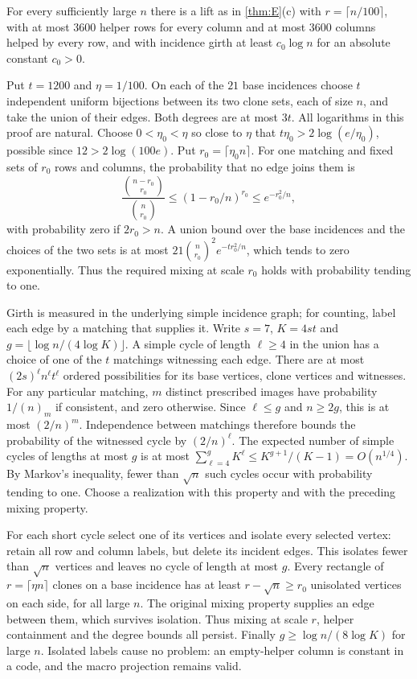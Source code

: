\begin{proposition}\label{prop:lifts}
\notformalized
For every sufficiently large $n$ there is a lift as in \cref{thm:E}(c) with $r=\lceil n/100\rceil$, with at most
$3600$ helper rows for every column and at most $3600$ columns helped by every row, and with incidence girth at least
$c_0\log n$ for an absolute constant $c_0>0$.
\end{proposition}
\begin{informalproof}
Put $t=1200$ and $\eta=1/100$. On each of the $21$ base incidences choose $t$ independent uniform bijections
between its two clone sets, each of size $n$, and take the union of their edges. Both degrees are at most $3t$.
All logarithms in this proof are natural. Choose $0<\eta_0<\eta$ so close to $\eta$ that
$t\eta_0>2\log(e/\eta_0)$, possible since $12>2\log(100e)$. Put $r_0=\lceil\eta_0 n\rceil$.
For one matching and fixed sets of $r_0$ rows and columns, the probability that no edge joins them is
\[
 \frac{\binom{n-r_0}{r_0}}{\binom n{r_0}}
 \le (1-r_0/n)^{r_0}\le e^{-r_0^2/n},
\]
with probability zero if $2r_0>n$. A union bound over the base incidences and the choices of the two sets is at most
$21\binom n{r_0}^{2}e^{-t r_0^2/n}$, which tends to zero exponentially. Thus the required mixing at scale $r_0$
holds with probability tending to one.

Girth is measured in the underlying simple incidence graph; for counting, label each edge by a matching that
supplies it. Write $s=7$, $K=4st$ and
$g=\lfloor\log n/(4\log K)\rfloor$. A simple cycle of length $\ell\ge4$ in the union has a choice of one of the
$t$ matchings witnessing each edge. There are at most $(2s)^\ell n^\ell t^\ell$ ordered possibilities for its
base vertices, clone vertices and witnesses. For any particular matching, $m$ distinct prescribed images have
probability $1/(n)_m$ if consistent, and zero otherwise. Since $\ell\le g$ and $n\ge2g$, this is at most
$(2/n)^m$. Independence between matchings therefore bounds the probability of the witnessed cycle by
$(2/n)^\ell$. The expected number of simple cycles of lengths at most $g$ is at most
$\sum_{\ell=4}^{g}K^\ell\le K^{g+1}/(K-1)=O(n^{1/4})$.
By Markov's inequality, fewer than $\sqrt n$ such cycles occur with probability tending to one. Choose a realization
with this property and with the preceding mixing property.

For each short cycle select one of its vertices and isolate every selected vertex: retain all row and column
labels, but delete its incident edges. This isolates fewer than $\sqrt n$ vertices and leaves no cycle of length
at most $g$. Every rectangle of $r=\lceil\eta n\rceil$ clones on a base incidence has at least $r-\sqrt n\ge r_0$
unisolated vertices on each side, for all large $n$. The original mixing property supplies an edge between them,
which survives isolation. Thus mixing at scale $r$, helper containment and the degree bounds all persist.
Finally $g\ge\log n/(8\log K)$ for large $n$. Isolated labels cause no problem: an empty-helper column is constant
in a code, and the macro projection remains valid.
\end{informalproof}

